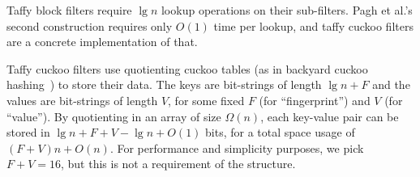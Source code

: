 \documentclass[sigconf, nonacm]{acmart}
\newcommand{\etal}{et al.}
\begin{document}

Taffy block filters require $\lg n$ lookup operations on their sub-filters.
Pagh \etal{}'s second construction requires only $O(1)$ time per lookup, and taffy cuckoo filters are a concrete implementation of that.

Taffy cuckoo filters use quotienting cuckoo tables (as in backyard cuckoo hashing~\cite{backyard}) to store their data.
The keys are bit-strings of length $\lg n + F$ and the values are bit-strings of length $V$, for some fixed $F$ (for ``fingerprint'') and $V$ (for ``value'').
By quotienting in an array of size $\Omega(n)$, each key-value pair can be stored in $\lg n + F + V - \lg n + O(1)$ bits, for a total space usage of $(F+V)n + O(n)$.
For performance and simplicity purposes, we pick $F + V = 16$, but this is not a requirement of the structure.


\end{document}
